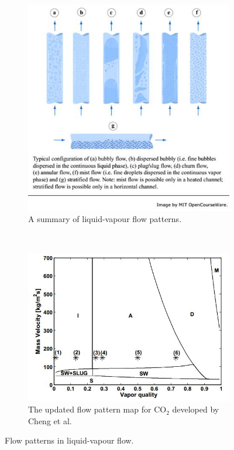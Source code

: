 \documentclass{report}
\begin{document}
\begin{figure}
        \centering
        \begin{subfigure}[b]{0.5\textwidth}
                \includegraphics[width=\textwidth]{flowPatterns}
                \caption{A summary of liquid-vapour flow patterns. \cite{MIT}}
  				\label{fig:flowPatterns}
        \end{subfigure}%
          \\
        \begin{subfigure}[b]{0.5\textwidth}
                \includegraphics[width=\textwidth]{chengMap}
                \caption{The updated flow pattern map for CO$_2$ developed by Cheng et al. \cite{Cheng 2008}}
  				\label{fig:chengMap}
        \end{subfigure}
		\caption{Flow patterns in liquid-vapour flow.}
\end{figure}
\end{document}
